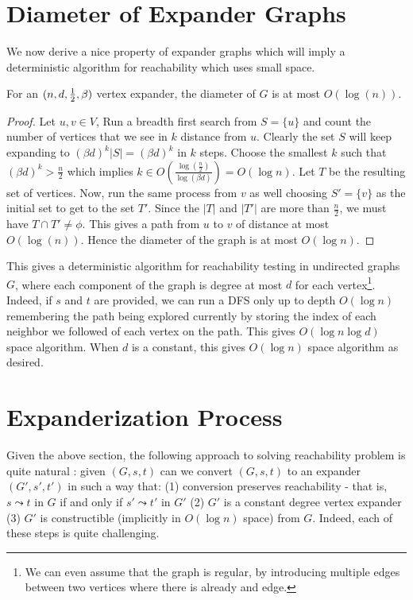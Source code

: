 \section{Diameter of Expander Graphs}

We now derive a nice property of expander graphs which will imply a deterministic algorithm for reachability which uses small space.

\begin{lemma}
For an $(n,d,\frac{1}{2},\beta)$ vertex expander, the diameter of $G$ is at most $O(\log\left(n\right))$.
\end{lemma}
\begin{proof}
Let $u,v \in V$, Run a breadth first search from $S=\{u\}$ and count the number of vertices that we see in $k$ distance from $u$. Clearly the set $S$ will keep expanding to $(\beta d)^k|S|=(\beta d)^k$ in $k$ steps. Choose the smallest $k$ such that $(\beta d)^k > \frac{n}{2}$ which implies $k \in O(\frac{\log\left(\frac{n}{2}\right)}{\log(\beta d)}) = O(\log n)$. Let $T$ be the resulting set of vertices. Now, run the same process from $v$ as well choosing $S'=\{v\}$ as the initial set to get to the set $T'.$ Since the $|T|$ and $|T'|$ are more than $\frac{n}{2}$, we must have $T \cap T' \ne \phi$. This gives a path from $u$ to $v$ of distance at most $O(\log\left(n\right))$. Hence the diameter of the graph is at most $O(\log n)$.
\end{proof}

This gives a deterministic algorithm for reachability testing in undirected graphs $G$, where each component of the graph is degree at most $d$ for each vertex\footnote{We can even assume that the graph is regular, by introducing multiple edges between two vertices where there is already and edge.}. Indeed, if $s$ and $t$ are provided, we can run a DFS only up to depth $O(\log n)$ remembering the path being explored currently by storing the index of each neighbor we followed of each vertex on the path. This gives $O(\log n \log d)$ space algorithm. When $d$ is a constant, this gives $O(\log n)$ space algorithm as desired.

\section{Expanderization Process}

Given the above section, the following approach to solving reachability problem is quite natural : given $(G,s,t)$ can we convert $(G,s,t)$ to an expander $(G',s',t')$ in such a way that: (1) conversion preserves reachability - that is, $s \leadsto t$ in $G$ if and only if $s' \leadsto t'$ in $G'$ (2) $G'$ is a constant degree vertex expander (3) $G'$ is constructible (implicitly in $O(\log n)$ space) from $G$. Indeed, each of these steps is quite challenging.

